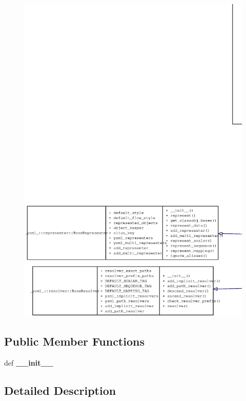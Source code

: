 \begin{figure}[H]
\begin{center}
\leavevmode
\includegraphics[width=400pt]{class__yaml___1_1dumper_1_1SafeDumper__coll__graph}
\end{center}
\end{figure}
\subsection*{Public Member Functions}
\begin{CompactItemize}
\item 
def {\bf \_\-\_\-init\_\-\_\-}
\end{CompactItemize}


\subsection{Detailed Description}


